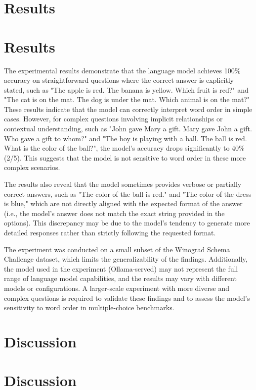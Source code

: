 \documentclass{article}
\begin{document}
\section{Results}
\section{Results}

The experimental results demonstrate that the language model achieves 100\% accuracy on straightforward questions where the correct answer is explicitly stated, such as "The apple is red. The banana is yellow. Which fruit is red?" and "The cat is on the mat. The dog is under the mat. Which animal is on the mat?" These results indicate that the model can correctly interpret word order in simple cases. However, for complex questions involving implicit relationships or contextual understanding, such as "John gave Mary a gift. Mary gave John a gift. Who gave a gift to whom?" and "The boy is playing with a ball. The ball is red. What is the color of the ball?", the model's accuracy drops significantly to 40\% (2/5). This suggests that the model is not sensitive to word order in these more complex scenarios. 

The results also reveal that the model sometimes provides verbose or partially correct answers, such as "The color of the ball is red." and "The color of the dress is blue," which are not directly aligned with the expected format of the answer (i.e., the model's answer does not match the exact string provided in the options). This discrepancy may be due to the model's tendency to generate more detailed responses rather than strictly following the requested format. 

The experiment was conducted on a small subset of the Winograd Schema Challenge dataset, which limits the generalizability of the findings. Additionally, the model used in the experiment (Ollama-served) may not represent the full range of language model capabilities, and the results may vary with different models or configurations. A larger-scale experiment with more diverse and complex questions is required to validate these findings and to assess the model's sensitivity to word order in multiple-choice benchmarks.
\section{Discussion}
\section*{Discussion}
\end{document}
